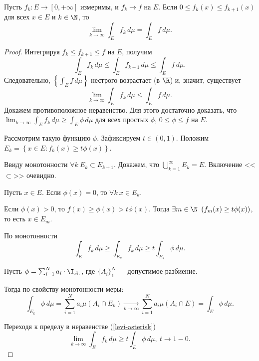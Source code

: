\begin{theorem}
    Пусть $f_k : E \rightarrow [0, +\infty]$ измеримы, и $f_k \rightarrow f$ на $E$. Если $0 \le f_k(x) \le f_{k + 1}(x)$ для всех $x \in E$ и $k \in \N$, то
    \[
        \lim_{k \rightarrow \infty} \int_E f_k \, d\mu = \int_E f \, d\mu.
    \]

    \begin{proof}
        Интегрируя $f_k \le f_{k + 1} \le f$ на $E$, получим
        \[
            \int_E f_k \, d\mu \le \int_E f_{k + 1} \, d\mu \le \int_E f \, d\mu.
        \]
        Следовательно, $\left\{\int_E f \, d\mu \right\}$ нестрого возрастает (в $\overline{\R}$) и, значит, существует
        \[
            \lim_{k \rightarrow \infty} \int_E f_k \, d\mu \le \int_E f \, d\mu.
        \]
        Докажем противоположное неравенство. Для этого достаточно доказать, что $\lim_{k \to \infty}\int_E f_k \, d\mu \ge \int_E \phi \, d\mu$ для всех простых $\phi$, $0 \le \phi \le f$ на $E$.

        Рассмотрим такую функцию $\phi$. Зафиксируем $t \in (0, 1)$. Положим $E_k = \left\{x \in E : f_k(x) \ge t\phi(x)\right\}$.

        Ввиду монотонности $\forall k \ E_k \subset E_{k + 1}$. Докажем, что $\bigcup_{k = 1}^\infty E_k = E$. Включение <<$\subset$>> очевидно.

        Пусть $x \in E$. Если $\phi(x) = 0$, то $\forall k \ x \in E_k$.

        Если $\phi(x) > 0$, то $f(x) \ge \phi(x) > t\phi(x)$. Тогда $\exists m \in \N \ \left(f_m(x) \ge t\phi(x)\right)$, то есть $x \in E_m$.

        По монотонности
        \begin{equation}
            \label{levi-asterisk}
            \int_E f_k \, d\mu \ge \int_{E_k} f_k \, d\mu \ge t\int_{E_k} \phi \, d\mu.
        \end{equation}

        Пусть $\phi = \sum_{i = 1}^N a_i \cdot \I_{A_i}$, где $\{A_i\}_1^N$ --- допустимое разбиение.

        Тогда по свойству монотонности меры:
        \[
            \int_{E_k} \phi \, d\mu = \sum_{i = 1}^N a_i \mu(A_i \cap E_k) \underset{k \rightarrow \infty}{\rightarrow} \sum_{i = 1}^N a_i \mu(A_i \cap E) = \int_E \phi \, d\mu.
        \]

        Переходя к пределу в неравенстве (\ref{levi-asterisk})
        \[
            \lim_{k \rightarrow \infty} \int_E f_k \, d\mu \ge t \int_E \phi \, d\mu, \ t \rightarrow 1 - 0.
        \]
    \end{proof}
\end{theorem}

